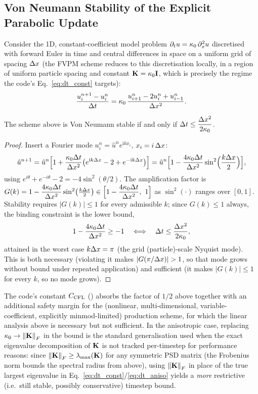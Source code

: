 \subsection{Von Neumann Stability of the Explicit Parabolic Update}
\label{app:von-neumann}
Consider the 1D, constant-coefficient model problem
$\partial_t u = \kappa_{0}\,\partial_x^2 u$ discretised with forward Euler
in time and central differences in space on a uniform grid of spacing
$\Delta x$ (the FVPM scheme reduces to this discretisation locally, in a
region of uniform particle spacing and constant $\mathbf{K}=\kappa_{0}\mathbf I$,
which is precisely the regime the code's
Eq.~\eqref{eq:dt_const} targets):
\begin{equation}
  \frac{u_i^{n+1}-u_i^n}{\Delta t} = \kappa_{0}\,\frac{u_{i+1}^n - 2u_i^n + u_{i-1}^n}{\Delta x^2} .
\end{equation}
\begin{proposition}
The scheme above is Von Neumann stable if and only if
$\Delta t \le \dfrac{\Delta x^2}{2\kappa_{0}}$.
\end{proposition}
\begin{proof}
Insert a Fourier mode $u_i^n = \hat u^n e^{\mathrm i k x_i}$, $x_i = i\,\Delta x$:
\begin{equation}
  \hat u^{n+1} = \hat u^n\Big[1 + \frac{\kappa_{0}\Delta t}{\Delta x^2}\big(e^{\mathrm i k\Delta x} - 2 + e^{-\mathrm i k\Delta x}\big)\Big]
  = \hat u^n\Big[1 - \frac{4\kappa_{0}\Delta t}{\Delta x^2}\sin^2\!\Big(\frac{k\Delta x}{2}\Big)\Big] ,
\end{equation}
using $e^{i\theta}+e^{-i\theta}-2 = -4\sin^2(\theta/2)$. The amplification
factor is
$G(k) = 1 - \dfrac{4\kappa_{0}\Delta t}{\Delta x^2}\sin^2\!\big(\tfrac{k\Delta x}{2}\big) \in
\Big[1-\dfrac{4\kappa_{0}\Delta t}{\Delta x^2},\ 1\Big]$
as $\sin^2(\cdot)$ ranges over $[0,1]$. Stability requires
$|G(k)|\le 1$ for every admissible $k$; since $G(k)\le1$ always, the
binding constraint is the lower bound,
\begin{equation}
  1 - \frac{4\kappa_{0}\Delta t}{\Delta x^2} \ge -1
  \quad\Longleftrightarrow\quad
  \Delta t \le \frac{\Delta x^2}{2\kappa_{0}} ,
\end{equation}
attained in the worst case $k\Delta x=\pi$ (the grid (particle)-scale
Nyquist mode). This is both necessary (violating it makes $|G(\pi/\dx)|>1$,
so that mode grows without bound under repeated application) and
sufficient (it makes $|G(k)|\le1$ for every $k$, so no mode grows).
\end{proof}
The code's constant $C_{\mathrm{CFL}}$ () absorbs
the factor of $1/2$ above together with an additional safety margin for
the (nonlinear, multi-dimensional, variable-coefficient, explicitly
minmod-limited) production scheme, for which the linear analysis above
is necessary but not sufficient. In the anisotropic case, replacing
$\kappa_{0} \to \norm{\mathbf{K}}_F$ in the bound is the standard generalisation
used when the exact eigenvalue decomposition of $\mathbf{K}$ is not tracked
per-timestep for performance reasons: since
$\norm{\mathbf{K}}_F \ge \lambda_{\max}(\mathbf{K})$ for any symmetric PSD matrix
(the Frobenius norm bounds the spectral radius from above), using
$\norm{\mathbf{K}}_F$ in place of the true largest eigenvalue in
Eq.~\eqref{eq:dt_const}/\eqref{eq:dt_aniso} yields a \emph{more}
restrictive (i.e.\ still stable, possibly conservative) timestep bound.

